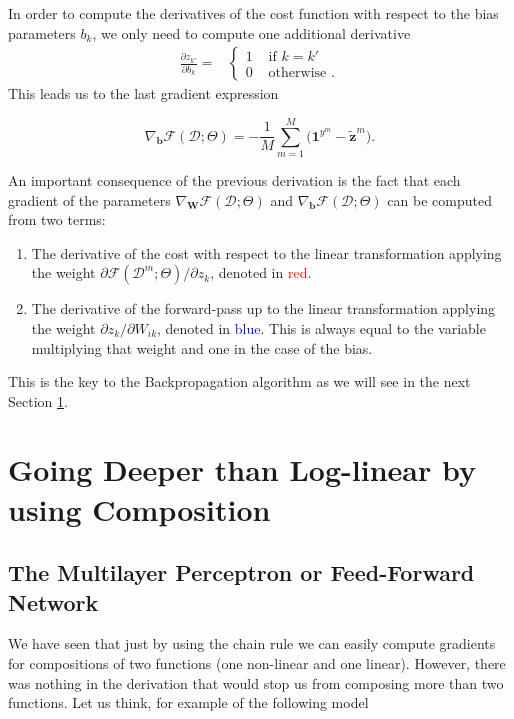 In order to compute the derivatives of the cost function with respect to the
bias parameters $b_{k}$, we only need to compute one additional derivative
\begin{align}
\frac{\partial z_{k'}}{\partial b_{k}} = 
  &\begin{cases}
      1  &  \mbox{ if } k = k'\\ 
      0  &  \mbox{ otherwise }.
  \end{cases} 
  \label{eqn:eqsilonq}
\end{align}
%
This leads us to the last gradient expression

\begin{equation}
\nabla_\mathbf{b}\mathcal{F}(\mathcal{D};\Theta) = -\frac{1}{M}\sum_{m=1}^{M} \Big(\mathrm{\mathbf{1}}^{y^m} - \tilde{\mathbf{z}}^m \Big).
\label{eq:gradBias}
\end{equation}

\noindent An important consequence of the previous derivation is the fact that each 
gradient of the parameters $\nabla_\mathbf{W}\mathcal{F}(\mathcal{D};\Theta)$ and $\nabla_\mathbf{b}\mathcal{F}(\mathcal{D};\Theta)$ can be computed from two terms: 
%
\begin{enumerate}
\item The derivative of the cost with respect to the linear transformation applying the weight $\partial \mathcal{F}(\mathcal{D}^m;\Theta)/\partial z_k$, denoted in \textcolor{red}{red}.
\item The derivative of the forward-pass up to the linear transformation applying the weight $\partial z_k/\partial W_{ik}$, denoted in \textcolor{blue}{blue}. This is always equal to the variable multiplying that weight and one in the case of the bias.
\end{enumerate}
%
\noindent This is the key to the Backpropagation algorithm as we will see in the next Section \ref{sec:deep_forward}.

\section{Going Deeper than Log-linear by using Composition}
\label{sec:deep_forward}

\subsection{The Multilayer Perceptron or Feed-Forward Network}

We have seen that just by using the chain rule we can easily compute gradients for
compositions of two functions (one non-linear and one linear). However, there
was nothing in the derivation that would stop us from composing more than two
functions. Let us think, for example of the following model

